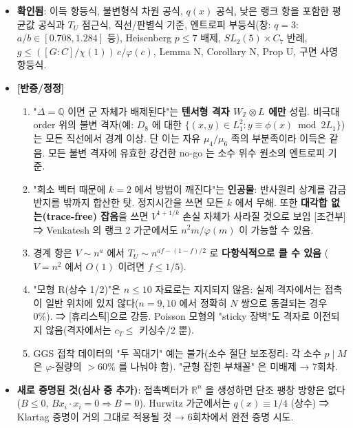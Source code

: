 \begin{itemize}
\tightlist
\item
  \textbf{확인됨}: 이득 항등식, 불변형식 차원 공식, \(q(x)\) 공식, 낮은 랭크 항을 포함한 평균값 공식과 \(T_U\) 점근식, 직선/판별식 기준, 엔트로피 부등식(창: \(q=3\): \(a/b\in[0.708,1.284]\) 등), Heisenberg \(p\le7\) 배제, \(SL_2(5)\times C_7\) 반례, \(g\le([G:C]/\chi(1))\,c/\varphi(c)\), Lemma N, Corollary N\textquotesingle, Prop U, 구면 사영 항등식.
\item
  \textbf{{[}반증/정정{]}}

  \begin{enumerate}
  \def\labelenumi{\arabic{enumi}.}
  \tightlist
  \item
    "\(\Delta=\mathbb Q\) 이면 군 자체가 배제된다"는 \textbf{텐서형 격자 \(W_\mathbb Z\otimes L\) 에만} 성립. 비극대 order 위의 불변 격자(예: \(D_8\) 에 대한 \(\{(x,y)\in L_1^2:y\equiv\phi(x)\bmod 2L_1\}\))는 모든 직선에서 경계 이상. 단 이는 자유 \(\mu_4/\mu_6\) 족의 부분족이라 이득은 같음. 모든 불변 격자에 유효한 강건한 no-go 는 소수 위수 원소의 엔트로피 기준.
  \item
    "희소 벡터 때문에 \(k=2\) 에서 방법이 깨진다"는 \textbf{인공물}: 반사원리 상계를 감금 반지름 밖까지 합산한 탓. 정지시간을 쓰면 모든 \(k\) 에서 무해. 또한 \textbf{대각합 없는(trace-free) 잡음}을 쓰면 \(V^{1+1/k}\) 손실 자체가 사라질 것으로 보임 {[}조건부{]} ⇒ Venkatesh 의 랭크 2 가군에서도 \(n^2m/\varphi(m)\) 이 가능할 수 있음.
  \item
    경계 항은 \(V\sim n^a\) 에서 \(T_U\sim n^{af-(1-f)/2}\) 로 \textbf{다항식적으로 클 수 있음} (\(V=n^2\) 에서 \(O(1)\) 이려면 \(f\le1/5\)).
  \item
    "모형 R(상수 1/2)"은 \(n\le10\) 자료로는 지지되지 않음: 실제 격자에서는 접촉이 일반 위치에 있지 않다(\(n=9,10\) 에서 정확히 \(N\) 쌍으로 동결되는 경우 0\%). ⇒ {[}휴리스틱{]}으로 강등. Poisson 모형의 "sticky 장벽"도 격자로 이전되지 않음(격자에서는 \(c_T\le\) 키싱수/2 뿐).
  \item
    GGS 접착 데이터의 "두 꼭대기" 예는 불가(소수 절단 보조정리: 각 소수 \(p\mid M\) 은 \(\varphi\)-질량의 \(>60\%\) 를 나눠야 함). "균형 잡힌 부채꼴" 은 미배제 → 7회차.
  \end{enumerate}
\item
  \textbf{새로 증명된 것(심사 중 추가)}: 접촉벡터가 \(\mathbb R^n\) 을 생성하면 단조 팽창 방향은 없다(\(B\le0\), \(Bx_i\cdot x_i=0\Rightarrow B=0\)). Hurwitz 가군에서는 \(q(x)\equiv1/4\) (상수) ⇒ Klartag 증명이 거의 그대로 적용될 것 → 6회차에서 완전 증명 시도.
\end{itemize}

